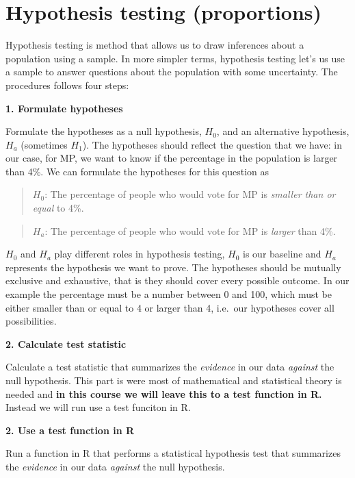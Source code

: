 \documentclass[
  letterpaper,
  DIV=11,
  numbers=noendperiod]{scrreprt}
\begin{document}
\section{Hypothesis testing
(proportions)}\label{hypothesis-testing-proportions}

Hypothesis testing is method that allows us to draw inferences about a
population using a sample. In more simpler terms, hypothesis testing
let's us use a sample to answer questions about the population with some
uncertainty. The procedures follows four steps:

\textbf{1. Formulate hypotheses}

Formulate the hypotheses as a null hypothesis, \(H_0\), and an
alternative hypothesis, \(H_a\) (sometimes \(H_1\)). The hypotheses
should reflect the question that we have: in our case, for MP, we want
to know if the percentage in the population is larger than 4\%. We can
formulate the hypotheses for this question as

\begin{quote}
\textbf{\(H_0\)}: The percentage of people who would vote for MP is
\emph{smaller than or equal} to 4\%.
\end{quote}

\begin{quote}
\textbf{\(H_a\)}: The percentage of people who would vote for MP is
\emph{larger} than 4\%.
\end{quote}

\(H_0\) and \(H_a\) play different roles in hypothesis testing, \(H_0\)
is our baseline and \(H_a\) represents the hypothesis we want to prove.
The hypotheses should be mutually exclusive and exhaustive, that is they
should cover every possible outcome. In our example the percentage must
be a number between 0 and 100, which must be either smaller than or
equal to 4 or larger than 4, i.e.~our hypotheses cover all
possibilities.

{\textbf{2. Calculate test statistic}}

{Calculate a test statistic that summarizes the \emph{evidence} in our
data \emph{against} the null hypothesis. This part is were most of
mathematical and statistical theory is needed and \textbf{in this course
we will leave this to a test function in R.} Instead we will run use a
test funciton in R.}

\textbf{2. Use a test function in R}

Run a function in R that performs a statistical hypothesis test that
summarizes the \emph{evidence} in our data \emph{against} the null
hypothesis.
\end{document}
